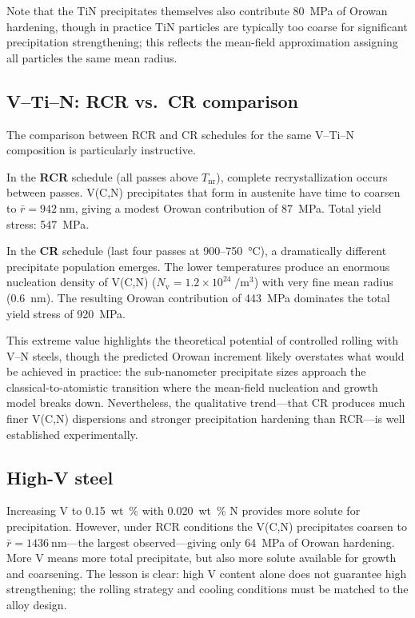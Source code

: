 \documentclass[11pt,a4paper]{article}
\newcommand{\Nv}{\ensuremath{N_\mathrm{v}}}
\begin{document}
Note that the TiN precipitates themselves also contribute \SI{80}{\mega\pascal}
of Orowan hardening, though in practice TiN particles are typically too coarse
for significant precipitation strengthening; this reflects the mean-field
approximation assigning all particles the same mean radius.

\subsection{V--Ti--N: RCR vs.\ CR comparison}

The comparison between RCR and CR schedules for the same V--Ti--N composition
is particularly instructive.

In the \textbf{RCR} schedule (all passes above $T_\mathrm{nr}$), complete
recrystallization occurs between passes.  V(C,N) precipitates that form in
austenite have time to coarsen to $\bar{r} = \SI{942}{\nano\metre}$, giving a
modest Orowan contribution of \SI{87}{\mega\pascal}.  Total yield stress:
\SI{547}{\mega\pascal}.

In the \textbf{CR} schedule (last four passes at 900--\SI{750}{\degreeCelsius}),
a dramatically different precipitate population emerges.  The lower temperatures
produce an enormous nucleation density of V(C,N)
($\Nv = 1.2 \times 10^{24}\;\si{\per\metre\cubed}$) with very fine mean radius
(\SI{0.6}{\nano\metre}).  The resulting Orowan contribution of
\SI{443}{\mega\pascal} dominates the total yield stress of
\SI{920}{\mega\pascal}.

This extreme value highlights the theoretical potential of controlled rolling
with V--N steels, though the predicted Orowan increment likely overstates what
would be achieved in practice: the sub-nanometer precipitate sizes approach the
classical-to-atomistic transition where the mean-field nucleation and growth
model breaks down.  Nevertheless, the qualitative trend---that CR produces much
finer V(C,N) dispersions and stronger precipitation hardening than RCR---is
well established experimentally.

\subsection{High-V steel}

Increasing V to \SI{0.15}{wt.\%} with \SI{0.020}{wt.\%} N provides more solute
for precipitation.  However, under RCR conditions the V(C,N) precipitates
coarsen to $\bar{r} = \SI{1436}{\nano\metre}$---the largest observed---giving
only \SI{64}{\mega\pascal} of Orowan hardening.  More V means more total
precipitate, but also more solute available for growth and coarsening.  The
lesson is clear: high V content alone does not guarantee high strengthening; the
rolling strategy and cooling conditions must be matched to the alloy design.
\end{document}
